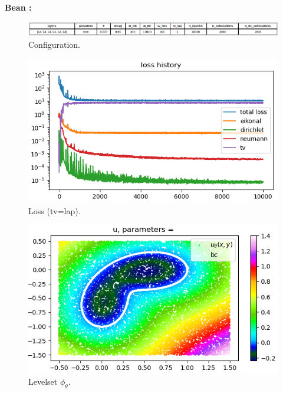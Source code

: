 \documentclass[french]{article}
\begin{document}
	\newpage
	\textbf{Bean :}
	
	\begin{figure}[H]
		\centering
		\includegraphics[width=\linewidth]{"levelset/bean/config_bean.png"}
		\caption{Configuration.}
	\end{figure}
	
	\begin{minipage}{0.33\linewidth}
		\begin{figure}[H]
			\centering
			\includegraphics[width=\linewidth]{"levelset/bean/loss_bean.png"}
			\caption{Loss (tv=lap).}
		\end{figure}
	\end{minipage}
	\begin{minipage}{0.33\linewidth}
		\begin{figure}[H]
			\centering
			\includegraphics[width=\linewidth]{"levelset/bean/sol_bean.png"}
			\caption{Levelset $\phi_\theta$.}
		\end{figure}
	\end{minipage}
\end{document}
